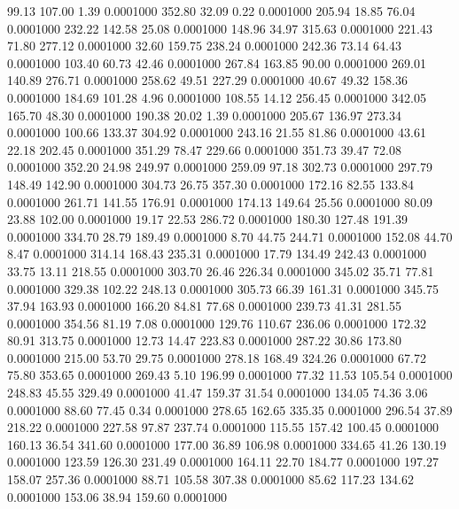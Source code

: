   99.13  107.00    1.39   0.0001000
 352.80   32.09    0.22   0.0001000
 205.94   18.85   76.04   0.0001000
 232.22  142.58   25.08   0.0001000
 148.96   34.97  315.63   0.0001000
 221.43   71.80  277.12   0.0001000
  32.60  159.75  238.24   0.0001000
 242.36   73.14   64.43   0.0001000
 103.40   60.73   42.46   0.0001000
 267.84  163.85   90.00   0.0001000
 269.01  140.89  276.71   0.0001000
 258.62   49.51  227.29   0.0001000
  40.67   49.32  158.36   0.0001000
 184.69  101.28    4.96   0.0001000
 108.55   14.12  256.45   0.0001000
 342.05  165.70   48.30   0.0001000
 190.38   20.02    1.39   0.0001000
 205.67  136.97  273.34   0.0001000
 100.66  133.37  304.92   0.0001000
 243.16   21.55   81.86   0.0001000
  43.61   22.18  202.45   0.0001000
 351.29   78.47  229.66   0.0001000
 351.73   39.47   72.08   0.0001000
 352.20   24.98  249.97   0.0001000
 259.09   97.18  302.73   0.0001000
 297.79  148.49  142.90   0.0001000
 304.73   26.75  357.30   0.0001000
 172.16   82.55  133.84   0.0001000
 261.71  141.55  176.91   0.0001000
 174.13  149.64   25.56   0.0001000
  80.09   23.88  102.00   0.0001000
  19.17   22.53  286.72   0.0001000
 180.30  127.48  191.39   0.0001000
 334.70   28.79  189.49   0.0001000
   8.70   44.75  244.71   0.0001000
 152.08   44.70    8.47   0.0001000
 314.14  168.43  235.31   0.0001000
  17.79  134.49  242.43   0.0001000
  33.75   13.11  218.55   0.0001000
 303.70   26.46  226.34   0.0001000
 345.02   35.71   77.81   0.0001000
 329.38  102.22  248.13   0.0001000
 305.73   66.39  161.31   0.0001000
 345.75   37.94  163.93   0.0001000
 166.20   84.81   77.68   0.0001000
 239.73   41.31  281.55   0.0001000
 354.56   81.19    7.08   0.0001000
 129.76  110.67  236.06   0.0001000
 172.32   80.91  313.75   0.0001000
  12.73   14.47  223.83   0.0001000
 287.22   30.86  173.80   0.0001000
 215.00   53.70   29.75   0.0001000
 278.18  168.49  324.26   0.0001000
  67.72   75.80  353.65   0.0001000
 269.43    5.10  196.99   0.0001000
  77.32   11.53  105.54   0.0001000
 248.83   45.55  329.49   0.0001000
  41.47  159.37   31.54   0.0001000
 134.05   74.36    3.06   0.0001000
  88.60   77.45    0.34   0.0001000
 278.65  162.65  335.35   0.0001000
 296.54   37.89  218.22   0.0001000
 227.58   97.87  237.74   0.0001000
 115.55  157.42  100.45   0.0001000
 160.13   36.54  341.60   0.0001000
 177.00   36.89  106.98   0.0001000
 334.65   41.26  130.19   0.0001000
 123.59  126.30  231.49   0.0001000
 164.11   22.70  184.77   0.0001000
 197.27  158.07  257.36   0.0001000
  88.71  105.58  307.38   0.0001000
  85.62  117.23  134.62   0.0001000
 153.06   38.94  159.60   0.0001000
